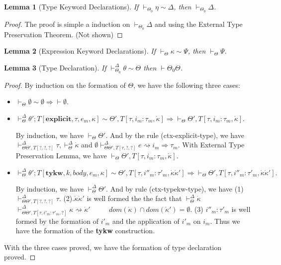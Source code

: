 \documentclass[letterpaper, notitlepage]{article}
\newcommand{\myvdash}{\vdash_{\Theta}^{\Delta}}
\newtheorem{lemma}{Lemma}
\begin{document}
\begin{lemma}[Type Keyword Declarations] 
If $\vdash_{\Theta_0}\eta\sim\Delta$, then $\vdash_{\Theta_0}\Delta$.
\end{lemma}
\begin{proof}
The proof is simple a induction on $\vdash_{\Theta_0}\Delta$ and using the External Type Preservation Theorem. (Not shown)
\end{proof}

\begin{lemma}[Expression Keyword Declarations] If $\vdash_{\Theta}\kappa\sim\Psi$, then $\vdash_{\Theta}\Psi$.
\end{lemma}

\begin{lemma}[Type Declaration]
If $\vdash_{\Theta_0}^{\Delta}\theta\sim\Theta$ then $\vdash\Theta_0\Theta$.
\end{lemma}
\begin{proof}
By induction on the formation of $\Theta$, we have the following three cases:
\begin{itemize}
\item $\vdash_{\Theta}\emptyset\sim\emptyset \Longrightarrow \vdash{\emptyset}$.
\item ${\vdash^{\Delta}_{\Theta}} \theta';T[\mathbf{explicit},\tau,e_m,\kappa] \sim \Theta',T[\tau,i_m:\tau_m,\dot\kappa] \Longrightarrow \vdash_{\Theta}\Theta',T[\tau,i_m:\tau_m,\dot{\kappa}]$. 

By induction, we have $\vdash_{\Theta}\Theta'$. And by the rule (ctx-explicit-type), we have $\vdash_{\Theta\Theta',T[?,?,?]}^{\Delta}\tau, \myvdash\dot\kappa$ and $\emptyset\vdash_{\Theta\Theta',T[\tau,?,?]}^{\Delta}e\rightsquigarrow i_m\Rightarrow\tau_m$. With External Type Preservation Lemma, we have $\vdash_{\Theta}\Theta',T[\tau,i_m:\tau_m,\dot{\kappa}]$.
\item $\myvdash \theta';T[\mathbf{tykw},k,body,e_m,\kappa] \sim \Theta',T[\tau,i''_m:\tau'_m,\dot{\kappa}\dot{\kappa}'] \Longrightarrow \vdash_{\Theta}\Theta',T[\tau,i''_m:\tau'_m,\dot{\kappa}\dot{\kappa}'].$

By induction, we have $\myvdash\Theta'$. And by rule (ctx-typekw-type), we have (1) $\vdash_{\Theta\Theta',T[?,?,?]}^{\Delta}\tau$. (2).$\dot\kappa\dot\kappa'$ is well formed the the fact that $\myvdash \dot\kappa$~~~~ $\vdash^{\Delta}_{\Theta\Theta',T[\tau,i'_m:\tau'_m,?]}\kappa\rightsquigarrow\dot{\kappa}'$ ~~~~ $dom(\dot{\kappa})\cap dom(\dot{\kappa}')=\emptyset$. (3) $i''_m:\tau'_m$ is well formed by the formation of $i'_m$ and the application of $i'_m$ on $i_m$. Thus we have the formation of the \textbf{tykw} construction.
\end{itemize}
With the three cases proved, we have the formation of type declaration proved.
\end{proof}
\end{document}
